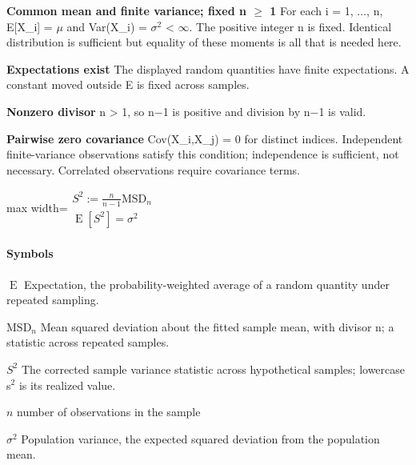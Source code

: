 \documentclass[11pt,a4paper]{article}
\begin{document}
\par\textbf{Common mean and finite variance; fixed n \ensuremath{\ge} 1} For each i = 1, \ensuremath{\ldots}, n, E[X\_i] = \ensuremath{\mu} and Var(X\_i) = \ensuremath{\sigma}\ensuremath{{}^2} < \ensuremath{\infty}. The positive integer n is fixed. Identical distribution is sufficient but equality of these moments is all that is needed here.
\par\textbf{Expectations exist} The displayed random quantities have finite expectations. A constant moved outside E is fixed across samples.
\par\textbf{Nonzero divisor} n > 1, so n\ensuremath{-}1 is positive and division by n\ensuremath{-}1 is valid.
\par\textbf{Pairwise zero covariance} Cov(X\_i,X\_j) = 0 for distinct indices. Independent finite-variance observations satisfy this condition; independence is sufficient, not necessary. Correlated observations require covariance terms.
\begin{center}\begin{adjustbox}{max width=\linewidth}$\displaystyle \begin{gathered}S^2:=\frac{n}{n-1}\mathrm{MSD}_n\\\boxed{\operatorname{E}[S^2]=\sigma^2}\end{gathered}$\end{adjustbox}\end{center}

\paragraph{Symbols}
\par\noindent\textbf{\(\operatorname{E}\)} Expectation, the probability-weighted average of a random quantity under repeated sampling.
\par\noindent\textbf{\(\mathrm{MSD}_n\)} Mean squared deviation about the fitted sample mean, with divisor n; a statistic across repeated samples.
\par\noindent\textbf{\(S^2\)} The corrected sample variance statistic across hypothetical samples; lowercase s\ensuremath{{}^2} is its realized value.
\par\noindent\textbf{\(n\)} number of observations in the sample
\par\noindent\textbf{\(\sigma^2\)} Population variance, the expected squared deviation from the population mean.
\medskip
\end{document}
